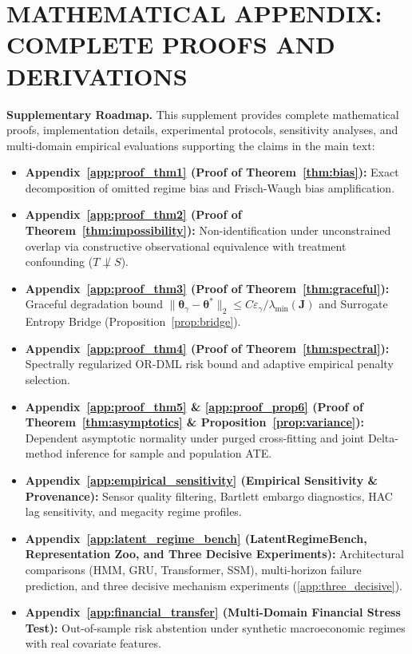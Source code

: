 \documentclass[twoside]{article}
\theoremstyle{definition}
\begin{document}
\section*{MATHEMATICAL APPENDIX: COMPLETE PROOFS AND DERIVATIONS}

\noindent\textbf{Supplementary Roadmap.} This supplement provides complete mathematical proofs, implementation details, experimental protocols, sensitivity analyses, and multi-domain empirical evaluations supporting the claims in the main text:
\begin{itemize}\setlength{\itemsep}{-2pt}\setlength{\parskip}{0pt}
    \item \textbf{Appendix~\ref{app:proof_thm1} (Proof of Theorem~\ref{thm:bias}):} Exact decomposition of omitted regime bias and Frisch-Waugh bias amplification.
    \item \textbf{Appendix~\ref{app:proof_thm2} (Proof of Theorem~\ref{thm:impossibility}):} Non-identification under unconstrained overlap via constructive observational equivalence with treatment confounding ($T \not\perp S$).
    \item \textbf{Appendix~\ref{app:proof_thm3} (Proof of Theorem~\ref{thm:graceful}):} Graceful degradation bound $\|\boldsymbol{\theta}_\gamma - \boldsymbol{\theta}^*\|_2 \le C\varepsilon_\gamma / \lambda_{\min}(\boldsymbol{J})$ and Surrogate Entropy Bridge (Proposition~\ref{prop:bridge}).
    \item \textbf{Appendix~\ref{app:proof_thm4} (Proof of Theorem~\ref{thm:spectral}):} Spectrally regularized OR-DML risk bound and adaptive empirical penalty selection.
    \item \textbf{Appendix~\ref{app:proof_thm5} \& \ref{app:proof_prop6} (Proof of Theorem~\ref{thm:asymptotics} \& Proposition~\ref{prop:variance}):} Dependent asymptotic normality under purged cross-fitting and joint Delta-method inference for sample and population ATE.
    \item \textbf{Appendix~\ref{app:empirical_sensitivity} (Empirical Sensitivity \& Provenance):} Sensor quality filtering, Bartlett embargo diagnostics, HAC lag sensitivity, and megacity regime profiles.
    \item \textbf{Appendix~\ref{app:latent_regime_bench} (LatentRegimeBench, Representation Zoo, and Three Decisive Experiments):} Architectural comparisons (HMM, GRU, Transformer, SSM), multi-horizon failure prediction, and three decisive mechanism experiments (\ref{app:three_decisive}).
    \item \textbf{Appendix~\ref{app:financial_transfer} (Multi-Domain Financial Stress Test):} Out-of-sample risk abstention under synthetic macroeconomic regimes with real covariate features.
\end{itemize}
\end{document}
